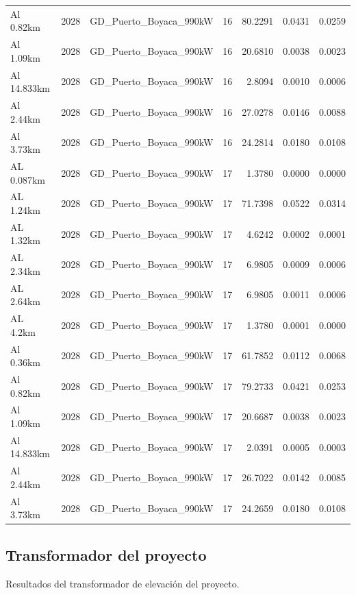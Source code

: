 \documentclass[11pt,a4paper]{article}
\begin{document}
\begin{longtable}{llllrrr}
Al 0.82km & 2028 & GD\_Puerto\_Boyaca\_990kW & 16 & 80.2291 & 0.0431 & 0.0259 \\
Al 1.09km & 2028 & GD\_Puerto\_Boyaca\_990kW & 16 & 20.6810 & 0.0038 & 0.0023 \\
Al 14.833km & 2028 & GD\_Puerto\_Boyaca\_990kW & 16 & 2.8094 & 0.0010 & 0.0006 \\
Al 2.44km & 2028 & GD\_Puerto\_Boyaca\_990kW & 16 & 27.0278 & 0.0146 & 0.0088 \\
Al 3.73km & 2028 & GD\_Puerto\_Boyaca\_990kW & 16 & 24.2814 & 0.0180 & 0.0108 \\
AL 0.087km & 2028 & GD\_Puerto\_Boyaca\_990kW & 17 & 1.3780 & 0.0000 & 0.0000 \\
AL 1.24km & 2028 & GD\_Puerto\_Boyaca\_990kW & 17 & 71.7398 & 0.0522 & 0.0314 \\
AL 1.32km & 2028 & GD\_Puerto\_Boyaca\_990kW & 17 & 4.6242 & 0.0002 & 0.0001 \\
AL 2.34km & 2028 & GD\_Puerto\_Boyaca\_990kW & 17 & 6.9805 & 0.0009 & 0.0006 \\
AL 2.64km & 2028 & GD\_Puerto\_Boyaca\_990kW & 17 & 6.9805 & 0.0011 & 0.0006 \\
AL 4.2km & 2028 & GD\_Puerto\_Boyaca\_990kW & 17 & 1.3780 & 0.0001 & 0.0000 \\
Al 0.36km & 2028 & GD\_Puerto\_Boyaca\_990kW & 17 & 61.7852 & 0.0112 & 0.0068 \\
Al 0.82km & 2028 & GD\_Puerto\_Boyaca\_990kW & 17 & 79.2733 & 0.0421 & 0.0253 \\
Al 1.09km & 2028 & GD\_Puerto\_Boyaca\_990kW & 17 & 20.6687 & 0.0038 & 0.0023 \\
Al 14.833km & 2028 & GD\_Puerto\_Boyaca\_990kW & 17 & 2.0391 & 0.0005 & 0.0003 \\
Al 2.44km & 2028 & GD\_Puerto\_Boyaca\_990kW & 17 & 26.7022 & 0.0142 & 0.0085 \\
Al 3.73km & 2028 & GD\_Puerto\_Boyaca\_990kW & 17 & 24.2659 & 0.0180 & 0.0108 \\
\end{longtable}

\subsection{Transformador del proyecto}

Resultados del transformador de elevaci\'on del proyecto.
\end{document}
